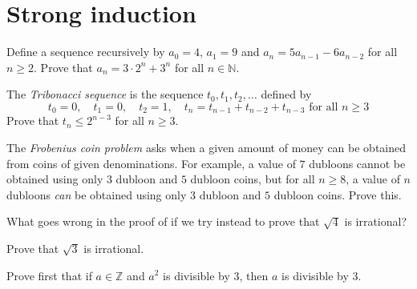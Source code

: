 \section{Strong induction}


\begin{exercise}
Define a sequence recursively by $a_0 = 4$, $a_1 = 9$ and $a_n = 5a_{n-1} - 6a_{n-2}$ for all $n \ge 2$. Prove that $a_n = 3 \cdot 2^n + 3^n$ for all $n \in \mathbb{N}$.
\end{exercise}

\begin{exercise}
The \textit{Tribonacci sequence} is the sequence $t_0, t_1, t_2, \dots$ defined by
\[ t_0 = 0, \quad t_1 = 0, \quad t_2 = 1, \quad t_n = t_{n-1} + t_{n-2} + t_{n-3} \text{ for all } n \ge 3 \]
Prove that $t_n \le 2^{n-3}$ for all $n \ge 3$.
\end{exercise}

\begin{exercise}
The \textit{Frobenius coin problem} asks when a given amount of money can be obtained from coins of given denominations. For example, a value of $7$ dubloons cannot be obtained using only $3$ dubloon and $5$ dubloon coins, but for all $n \ge 8$, a value of $n$ dubloons \textit{can} be obtained using only $3$ dubloon and $5$ dubloon coins. Prove this.
\end{exercise}



\begin{exercise}
What goes wrong in the proof of  if we try instead to prove that $\sqrt{4}$ is irrational?
\end{exercise}

\begin{exercise}
\label{exSquareRootThreeIsIrrational}
Prove that $\sqrt{3}$ is irrational.
\begin{backhint}
Prove first that if $a \in \mathbb{Z}$ and $a^2$ is divisible by $3$, then $a$ is divisible by $3$.
\end{backhint}
\end{exercise}

